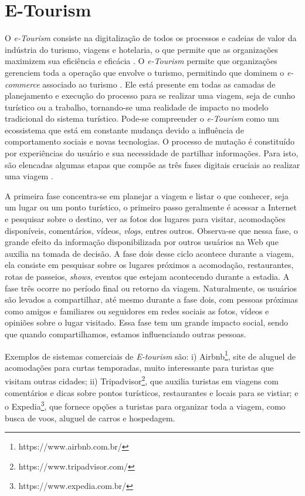 \documentclass[portuguese]{textolivre}
\begin{document}
\section{E-Tourism}\label{sec_3}
O \textit{e-Tourism} consiste na digitalização de todos os processos e cadeias de valor da indústria do turismo, viagens e hotelaria, o que permite que as organizações maximizem sua eficiência e eficácia \cite{Moura2013}. O \textit{e-Tourism} permite que organizações gerenciem toda a operação que envolve o turismo, permitindo que dominem o \textit{e-commerce} associado ao turismo \cite{Buhalis2005}. Ele está presente em todas as camadas de planejamento e execução do processo para se realizar uma viagem, seja de cunho turístico ou a trabalho, tornando-se uma realidade de impacto no modelo tradicional do sistema turístico. Pode-se compreender o \textit{e-Tourism} como um ecossistema que está em constante mudança devido a influência de comportamento sociais e novas tecnologias. O processo de mutação é constituído por experiências do usuário e sua necessidade de partilhar informações. Para isto, são elencadas algumas etapas que compõe as três fases digitais cruciais ao realizar uma viagem \cite{Raposo2012}.

A primeira fase concentra-se em planejar a viagem e listar o que conhecer, seja um lugar ou um ponto turístico, o primeiro passo geralmente é acessar a Internet e pesquisar sobre o destino, ver as fotos dos lugares para visitar, acomodações disponíveis, comentários, vídeos, \textit{vlogs}, entres outros. Observa-se que nessa fase, o grande efeito da informação disponibilizada por outros usuários na Web que auxilia na tomada de decisão. A fase dois desse ciclo acontece durante a viagem, ela consiste em pesquisar sobre os lugares próximos a acomodação, restaurantes, rotas de passeios, \textit{shows}, eventos que estejam acontecendo durante a estadia. A fase três ocorre no período final ou retorno da viagem. Naturalmente, os usuários são levados a compartilhar, até mesmo durante a fase dois, com pessoas próximas como amigos e familiares ou seguidores em redes sociais as fotos, vídeos e opiniões sobre o lugar visitado. Essa fase tem um grande impacto social, sendo que quando compartilhamos, estamos influenciando outras pessoas.

Exemplos de sistemas comerciais de \textit{E-tourism} são: i) Airbnb\footnote{https://www.airbnb.com.br/}, site de aluguel de acomodações para curtas temporadas, muito interessante para turistas que visitam outras cidades; ii) Tripadvisor\footnote{https://www.tripadvisor.com/}, que auxilia turistas em viagens com comentários e dicas sobre pontos turísticos, restaurantes e locais para se vistiar; e o Expedia\footnote{https://www.expedia.com.br/}, que fornece opções a turistas para organizar toda a viagem, como busca de voos, aluguel de carros e hospedagem.
\end{document}

